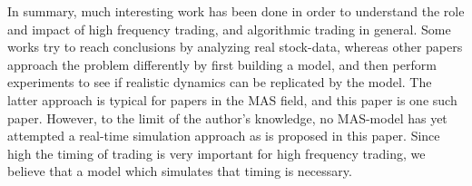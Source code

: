 In summary, much interesting work has been done in order to understand the role and impact of high frequency trading, and algorithmic trading in general. Some works try to reach conclusions by analyzing real stock-data, whereas other papers approach the problem differently by first building a model, and then perform experiments to see if realistic dynamics can be replicated by the model. The latter approach is typical for papers in the MAS field, and this paper is one such paper. However, to the limit of the author's knowledge, no MAS-model has yet attempted a real-time simulation approach as is proposed in this paper. Since high the timing of trading is very important for high frequency trading, we believe that a model which simulates that timing is necessary.

